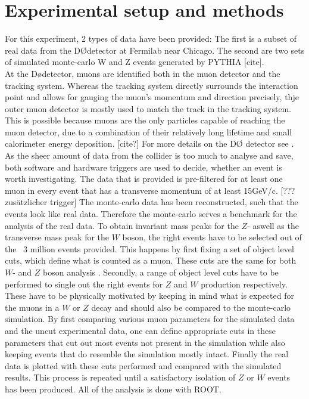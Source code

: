 \documentclass[twoside,        %
               BCOR12mm,       %
               ngerman,english, %
               fleqn,headsepline=false,footsepline=false
              ]{Vorlage/MFPREPORT}
\begin{document}
\section{Experimental setup and methods}
\label{sec:setup}
For this experiment, 2 types of data have been provided: The first is a subset
of real data from the D\O\;detector at Fermilab near Chicago. The second are two
sets of simulated monte-carlo W and Z events generated by PYTHIA [cite].\\
At the D\o detector, muons are identified  both in the muon detector and the
tracking system. Whereas the tracking system directly surrounds the interaction
point and allows for gauging the muon's momentum and direction precisely, thje
outer muon detector is mostly used to match the track in the tracking system.
This is possible because muons are the only particles capable of reaching the
muon detector, due to a combination of their relatively long lifetime and small calorimeter
energy deposition. [cite?] For more details on the D\O\;  detector see
\cite{d0}.
As the sheer amount of data from the collider is too much to analyse and save,
both software and hardware triggers are used to decide, whether an event is
worth investigating. The data that is provided is pre-filtered for at least one
muon in every event that has a transverse momentum of at least 15\;GeV/c. [???
zusätzlicher trigger] The monte-carlo data has been reconstructed, such that the
events look like real data. Therefore the monte-carlo serves a benchmark for
the analysis of the real data.
To obtain invariant mass peaks for the $Z$- aswell as the transverse mass peak
for the $W$ boson, the right events have to be selected out of the ~3 million
events provided. This happens by first fixing a set of object level cuts, which
define what is counted as a muon. These cuts are the same for both $W$- and $Z$ boson analysis
. Secondly, a range of object level cuts have to be performed to single
out the right events for $Z$ and $W$ production respectively. These have to be
physically motivated by keeping in mind what is expected for the muons in a
$W$ or $Z$ decay and should also be compared to the monte-carlo simulation. By
first comparing various muon parameters for the simulated data and the uncut
experimental data, one can define appropriate cuts in these parameters that cut
out most events not present in the simulation while also keeping events that do
resemble the simulation mostly intact. Finally the real data is plotted with
these cuts performed and compared with the simulated results. This process is
repeated until a satisfactory isolation of $Z$ or $W$ events has been produced.
All of the analysis is done with ROOT.
\end{document}
